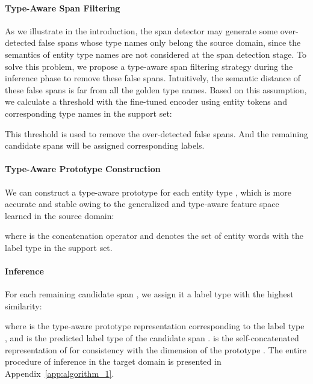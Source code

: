 \documentclass[11pt]{article}
\begin{document}
\vspace{-0mm}


\paragraph{Type-Aware Span Filtering}
As we illustrate in the introduction, the span detector may generate some over-detected false spans whose type names only belong the source domain, since the semantics of entity type names are not considered at the span detection stage.
To solve this problem, we propose a type-aware span filtering strategy during the inference phase to remove these false spans.
Intuitively, the semantic distance of these false spans is far from all the golden type names.
Based on this assumption, we calculate a threshold  with the fine-tuned encoder  using entity tokens and corresponding type names in the support set:

This threshold  is used to remove the over-detected false spans. 
And the remaining candidate spans will be assigned corresponding labels.

\paragraph{Type-Aware Prototype Construction}
We can construct a type-aware prototype for each entity type ,  which is more accurate and stable owing to the generalized and type-aware feature space learned in the source domain:

\vspace{-0mm}

where  is the concatenation operator and  denotes the set of entity words with the label type  in the support set.

\paragraph{Inference}
For each remaining candidate span , we assign it a label type  with the highest similarity:

\vspace{-0mm}

where  is the type-aware prototype representation corresponding to the label type , and  is the predicted  label type of the candidate span .  is the self-concatenated representation of  for consistency with the dimension of the prototype .
The entire procedure of inference in the target domain is presented in Appendix~\ref{app:algorithm_1}.
\end{document}
